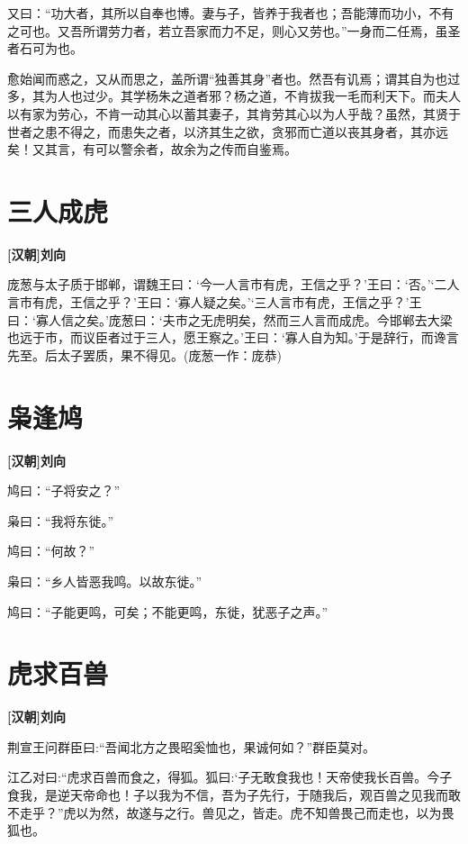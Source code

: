 \documentclass[UTF8,titlepage,oneside]{ctexbook}
\begin{document}
又曰：“功大者，其所以自奉也博。妻与子，皆养于我者也；吾能薄而功小，不有之可也。又吾所谓劳力者，若立吾家而力不足，则心又劳也。”一身而二任焉，虽圣者石可为也。

愈始闻而惑之，又从而思之，盖所谓“独善其身”者也。然吾有讥焉；谓其自为也过多，其为人也过少。其学杨朱之道者邪？杨之道，不肯拔我一毛而利天下。而夫人以有家为劳心，不肯一动其心以蓄其妻子，其肯劳其心以为人乎哉？虽然，其贤于世者之患不得之，而患失之者，以济其生之欲，贪邪而亡道以丧其身者，其亦远矣！又其言，有可以警余者，故余为之传而自鉴焉。


\chapter*{三人成虎}
\begin{center}
	\textbf{[汉朝]刘向}
\end{center}

庞葱与太子质于邯郸，谓魏王曰：‘今一人言市有虎，王信之乎？’王曰：‘否。’‘二人言市有虎，王信之乎？’王曰：‘寡人疑之矣。’‘三人言市有虎，王信之乎？’王曰：‘寡人信之矣。’庞葱曰：‘夫市之无虎明矣，然而三人言而成虎。今邯郸去大梁也远于市，而议臣者过于三人，愿王察之。’王曰：‘寡人自为知。’于是辞行，而谗言先至。后太子罢质，果不得见。(庞葱一作：庞恭)


\chapter*{枭逢鸠}
\begin{center}
	\textbf{[汉朝]刘向}
\end{center}


鸠曰：“子将安之？”

枭曰：“我将东徙。”

鸠曰：“何故？”

枭曰：“乡人皆恶我鸣。以故东徙。”

鸠曰：“子能更鸣，可矣；不能更鸣，东徙，犹恶子之声。”

\chapter*{虎求百兽}
\begin{center}
	\textbf{[汉朝]刘向}
\end{center}


荆宣王问群臣曰:“吾闻北方之畏昭奚恤也，果诚何如？”群臣莫对。

江乙对曰:“虎求百兽而食之，得狐。狐曰:‘子无敢食我也！天帝使我长百兽。今子食我，是逆天帝命也！子以我为不信，吾为子先行，于随我后，观百兽之见我而敢不走乎？”虎以为然，故遂与之行。兽见之，皆走。虎不知兽畏己而走也，以为畏狐也。
\end{document}
